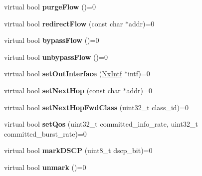 \begin{DoxyCompactItemize}
\item 
\hypertarget{classnxos_1_1NxPkt_a3b59c6a1e347587605251f58dbc05d86}{virtual bool {\bfseries purge\-Flow} ()=0}\label{classnxos_1_1NxPkt_a3b59c6a1e347587605251f58dbc05d86}

\item 
\hypertarget{classnxos_1_1NxPkt_ae30b30a559da5fffcc3f043daeaaa65f}{virtual bool {\bfseries redirect\-Flow} (const char $\ast$addr)=0}\label{classnxos_1_1NxPkt_ae30b30a559da5fffcc3f043daeaaa65f}

\item 
\hypertarget{classnxos_1_1NxPkt_a712e3395ec3905bcb3542db5010eb694}{virtual bool {\bfseries bypass\-Flow} ()=0}\label{classnxos_1_1NxPkt_a712e3395ec3905bcb3542db5010eb694}

\item 
\hypertarget{classnxos_1_1NxPkt_a4df1b6cf8b746cc530e74c129b555764}{virtual bool {\bfseries unbypass\-Flow} ()=0}\label{classnxos_1_1NxPkt_a4df1b6cf8b746cc530e74c129b555764}

\item 
\hypertarget{classnxos_1_1NxPkt_a938cc9c38270d3b8ff57c6a687f58515}{virtual bool {\bfseries set\-Out\-Interface} (\hyperlink{classnxos_1_1NxIntf}{Nx\-Intf} $\ast$intf)=0}\label{classnxos_1_1NxPkt_a938cc9c38270d3b8ff57c6a687f58515}

\item 
\hypertarget{classnxos_1_1NxPkt_a0bacbfa3d16b2edb5e3068debec213e1}{virtual bool {\bfseries set\-Next\-Hop} (const char $\ast$addr)=0}\label{classnxos_1_1NxPkt_a0bacbfa3d16b2edb5e3068debec213e1}

\item 
\hypertarget{classnxos_1_1NxPkt_a446a76afcd2509f3d9786683c2229014}{virtual bool {\bfseries set\-Next\-Hop\-Fwd\-Class} (uint32\-\_\-t class\-\_\-id)=0}\label{classnxos_1_1NxPkt_a446a76afcd2509f3d9786683c2229014}

\item 
\hypertarget{classnxos_1_1NxPkt_ae0fe0da25030e02f30014cfc26534b1c}{virtual bool {\bfseries set\-Qos} (uint32\-\_\-t committed\-\_\-info\-\_\-rate, uint32\-\_\-t committed\-\_\-burst\-\_\-rate)=0}\label{classnxos_1_1NxPkt_ae0fe0da25030e02f30014cfc26534b1c}

\item 
\hypertarget{classnxos_1_1NxPkt_a2fe795e5a8955c1376d9e8ea413d60be}{virtual bool {\bfseries mark\-D\-S\-C\-P} (uint8\-\_\-t dscp\-\_\-bit)=0}\label{classnxos_1_1NxPkt_a2fe795e5a8955c1376d9e8ea413d60be}

\item 
\hypertarget{classnxos_1_1NxPkt_ae63b5bef1b19816d0ac6cb9fb32fc0c5}{virtual bool {\bfseries unmark} ()=0}\label{classnxos_1_1NxPkt_ae63b5bef1b19816d0ac6cb9fb32fc0c5}


\end{DoxyCompactItemize}
